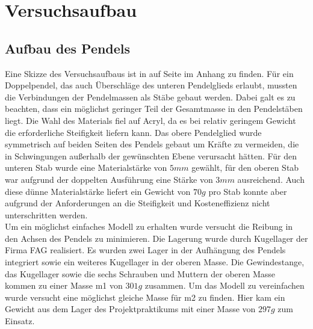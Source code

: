 \section{Versuchsaufbau}
\subsection{Aufbau des Pendels}
Eine Skizze des Versuchsaufbaus ist in auf Seite 
\pageref{pic:skizze_versuchsaufbau} im Anhang zu finden.
Für ein Doppelpendel, das auch Überschläge des unteren Pendelglieds erlaubt, mussten die Verbindungen der Pendelmassen als Stäbe gebaut werden. Dabei galt es zu beachten, dass ein möglichst geringer Teil der Gesamtmasse in den Pendelstäben liegt. Die Wahl des Materials fiel auf Acryl, da es bei relativ geringem Gewicht die erforderliche Steifigkeit liefern kann. Das obere Pendelglied wurde symmetrisch auf beiden Seiten des Pendels gebaut um Kräfte zu vermeiden, die in Schwingungen außerhalb der gewünschten Ebene verursacht hätten. Für den unteren Stab wurde eine Materialstärke von $5 mm$ gewählt, für den oberen Stab war aufgrund der doppelten Ausführung eine Stärke von $3 mm$ ausreichend.
Auch diese dünne Materialstärke liefert ein Gewicht von $70 g$ pro Stab konnte aber aufgrund der Anforderungen an die Steifigkeit und Kosteneffizienz nicht unterschritten werden.\\

Um ein möglichst einfaches Modell zu erhalten wurde versucht die Reibung in den Achsen des Pendels zu minimieren. Die Lagerung wurde durch Kugellager der Firma FAG realisiert. Es wurden zwei Lager in der Aufhängung des Pendels integriert sowie ein weiteres Kugellager in der oberen Masse.
Die Gewindestange, das Kugellager sowie die sechs Schrauben und Muttern der oberen Masse kommen zu einer Masse m1 von $301 g$ zusammen. Um das Modell zu vereinfachen wurde versucht eine möglichst gleiche Masse für m2 zu finden. Hier kam ein Gewicht aus dem Lager des Projektpraktikums mit einer Masse von $297 g$ zum Einsatz.

